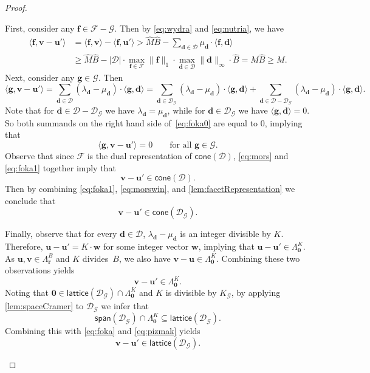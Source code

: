 \documentclass{theoretics}
\renewcommand{\geq}{\geqslant}
\newcommand{\Dd}{\mathcal{D}}
\newcommand{\tup}[1]{{\mathbf{#1}}}
\newcommand{\ww}{\tup w}
\newcommand{\ff}{\tup f}
\renewcommand{\gg}{\tup g}
\newcommand{\rr}{\tup r}
\newcommand{\dd}{\tup d}
\newcommand{\uu}{\tup u}
\newcommand{\myvv}{\tup v} %
\newcommand{\zero}{\tup 0}
\newcommand{\Ff}{\mathcal{F}}
\newcommand{\Gg}{\mathcal{G}}
\newcommand{\sca}[2]{\langle #1,#2\rangle}
\renewcommand{\setminus}{-}
\newcommand{\realcone}{\mathsf{cone}}
\newcommand{\lattice}{\mathsf{lattice}}
\newcommand{\spn}{\mathsf{span}}
\begin{document}
\begin{proof}
\begin{subproof}
 First, consider any $\ff\in \Ff\setminus \Gg$. Then by \cref{eq:wydra} and \cref{eq:nutria}, we have
 \begin{align}
\sca{\ff}{\myvv-\uu'} & =     \sca{\ff}{\myvv}-\sca{\ff}{\uu'} > \widehat{M}\widehat{B}-\sum_{\dd\in \Dd} \mu_\dd\cdot \sca{\ff}{\dd}\nonumber\\
                    & \geq  \widehat{M}\widehat{B}-|\Dd|\cdot \max_{\ff\in \Ff} \|\ff\|_1\cdot \max_{\dd\in \Dd} \|\dd\|_\infty\cdot \widehat{B} =  M\widehat{B} \geq M.\label{eq:mors}
 \end{align}
 Next, consider any $\gg\in \Gg$. Then
 \begin{equation}\label{eq:foka0}
\sca{\gg}{\myvv-\uu'}=\sum_{\dd\in \Dd} (\lambda_\dd-\mu_\dd)\cdot\sca{\gg}{\dd}=\sum_{\dd\in \Dd_\Gg} (\lambda_\dd-\mu_\dd)\cdot\sca{\gg}{\dd} + \sum_{\dd\in \Dd\setminus \Dd_\Gg} (\lambda_\dd-\mu_\dd)\cdot\sca{\gg}{\dd}.
 \end{equation}
 Note that for $\dd\in \Dd\setminus \Dd_\Gg$ we have $\lambda_\dd=\mu_\dd$, while for $\dd\in \Dd_\Gg$ we have $\sca{\gg}{\dd}=0$. So both summands on the right hand side of~\cref{eq:foka0} are equal to $0$, implying that
 \begin{equation}\label{eq:foka1}
\sca{\gg}{\myvv-\uu'}=0\qquad\textrm{for all }\gg\in \Gg.
 \end{equation}
 Observe that since $\Ff$ is the dual representation of $\realcone(\Dd)$, \cref{eq:mors} and \cref{eq:foka1} together imply that
 \begin{equation}\label{eq:morswin}
  \myvv-\uu'\in \realcone(\Dd).
 \end{equation}
 Then by combining \cref{eq:foka1}, \cref{eq:morswin}, and \cref{lem:facetRepresentation} we conclude that
 \begin{equation}\label{eq:foka}
  \myvv-\uu'\in \realcone(\Dd_\Gg).
 \end{equation}

 Finally, observe that for every $\dd\in \Dd$, $\lambda_\dd-\mu_\dd$ is an integer divisible by $K$. Therefore, $\uu-\uu'=K\cdot \ww$ for some integer vector $\ww$, implying that $\uu-\uu'\in \Lambda_{\zero}^{K}$.
 As $\uu,\myvv\in \Lambda_{\rr}^B$ and $K$ divides~$B$, we also have $\myvv-\uu\in \Lambda_{\zero}^{K}$. Combining these two observations yields
 \begin{equation}\label{eq:pizmak}
  \myvv-\uu'\in \Lambda_{\zero}^{K}.
 \end{equation}
 Noting that $\zero \in \lattice(\Dd_\Gg)\cap \Lambda_\zero^{K}$ and $K$ is divisible by $K_\Gg$, by applying \cref{lem:spaceCramer} to $\Dd_\Gg$ we infer that
 $$\spn(\Dd_\Gg)\cap \Lambda_{\zero}^{K}\subseteq \lattice(\Dd_\Gg).$$
 Combining this with \cref{eq:foka} and \cref{eq:pizmak} yields
 \begin{equation}\label{eq:manat}
\myvv-\uu'\in \lattice(\Dd_\Gg).
 \end{equation}


\end{subproof}
\end{proof}
\end{document}
